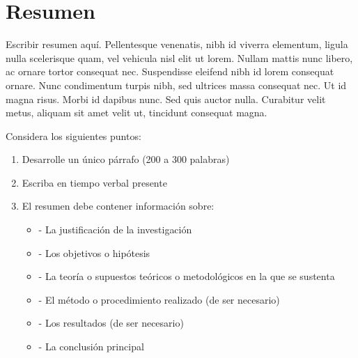 
\newpage
\clearpage{\pagestyle{empty}\cleardoublepage}
\newpage

\pagestyle{empty}
\newpage
\chapter*{\centering \large Resumen} 

{Escribir resumen aquí. Pellentesque venenatis, nibh id viverra elementum, ligula nulla scelerisque quam, vel vehicula nisl elit ut lorem. Nullam mattis nunc libero, ac ornare tortor consequat nec. Suspendisse eleifend nibh id lorem consequat ornare. Nunc condimentum turpis nibh, sed ultrices massa consequat nec. Ut id magna risus. Morbi id dapibus nunc. Sed quis auctor nulla. Curabitur velit metus, aliquam sit amet velit ut, tincidunt consequat magna.}

Considera los siguientes puntos:
\begin{enumerate}
	\item Desarrolle un único párrafo (200 a 300 palabras)
	\item Escriba en tiempo verbal presente
	\item El resumen debe contener información sobre:
	\begin{itemize}
		\item	- La justificación de la investigación
		\item	- Los objetivos o hipótesis
		\item	- La teoría o supuestos teóricos o metodológicos en la que se sustenta
		\item	- El método o procedimiento realizado (de ser necesario)
		\item	- Los resultados (de ser necesario)
		\item	- La conclusión principal
	\end{itemize}
\end{enumerate}